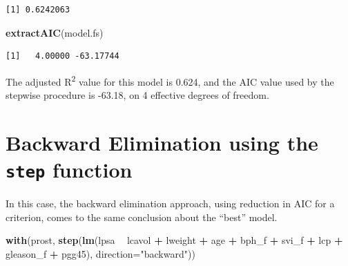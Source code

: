 \documentclass[]{book}
\newenvironment{Shaded}{\begin{snugshade}}{\end{snugshade}}
\newcommand{\KeywordTok}[1]{\textcolor[rgb]{0.13,0.29,0.53}{\textbf{#1}}}
\newcommand{\DataTypeTok}[1]{\textcolor[rgb]{0.13,0.29,0.53}{#1}}
\newcommand{\StringTok}[1]{\textcolor[rgb]{0.31,0.60,0.02}{#1}}
\newcommand{\OperatorTok}[1]{\textcolor[rgb]{0.81,0.36,0.00}{\textbf{#1}}}
\newcommand{\NormalTok}[1]{#1}
\theoremstyle{definition}
\theoremstyle{definition}
\theoremstyle{definition}
\theoremstyle{remark}
\begin{document}
\begin{verbatim}
[1] 0.6242063
\end{verbatim}

\begin{Shaded}
\begin{Highlighting}[]
\KeywordTok{extractAIC}\NormalTok{(model.fs)}
\end{Highlighting}
\end{Shaded}

\begin{verbatim}
[1]   4.00000 -63.17744
\end{verbatim}

The adjusted R\textsuperscript{2} value for this model is 0.624, and the
AIC value used by the stepwise procedure is -63.18, on 4 effective
degrees of freedom.

\section{\texorpdfstring{Backward Elimination using the \texttt{step}
function}{Backward Elimination using the step function}}\label{backward-elimination-using-the-step-function}

In this case, the backward elimination approach, using reduction in AIC
for a criterion, comes to the same conclusion about the ``best'' model.

\begin{Shaded}
\begin{Highlighting}[]
\KeywordTok{with}\NormalTok{(prost, }
     \KeywordTok{step}\NormalTok{(}\KeywordTok{lm}\NormalTok{(lpsa }\OperatorTok{~}\StringTok{ }\NormalTok{lcavol }\OperatorTok{+}\StringTok{ }\NormalTok{lweight }\OperatorTok{+}\StringTok{ }\NormalTok{age }\OperatorTok{+}\StringTok{ }\NormalTok{bph_f }\OperatorTok{+}\StringTok{ }
\StringTok{                 }\NormalTok{svi_f }\OperatorTok{+}\StringTok{ }\NormalTok{lcp }\OperatorTok{+}\StringTok{ }\NormalTok{gleason_f }\OperatorTok{+}\StringTok{ }\NormalTok{pgg45), }
          \DataTypeTok{direction=}\StringTok{"backward"}\NormalTok{))}
\end{Highlighting}
\end{Shaded}
\end{document}
